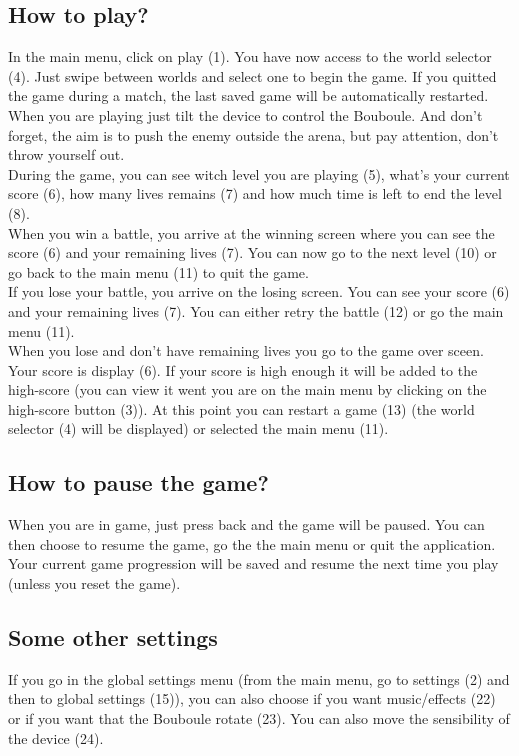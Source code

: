 \documentclass[a4paper,10pt]{report}
\begin{document}
	\subsection*{How to play?}

In the main menu, click on play (1). You have now access to the world selector (4). Just swipe between worlds and select one to begin the game. If you quitted the game during a match, the last saved game will be automatically restarted. \\


When you are playing just tilt the device to control the Bouboule. And don't forget, the aim is to push the enemy outside the arena, but pay attention, don't throw yourself out. \\

During the game, you can see witch level you are playing (5), what's your current score (6), how many lives remains (7) and how much time is left to end the level (8).\\

When you win a battle, you arrive at the winning screen where you can see the score (6) and your remaining lives (7). You can now go to the next level (10) or go back to the main menu (11) to quit the game. \\

If you lose your battle, you arrive on the losing screen. You can see your score (6) and your remaining lives (7). You can either retry the battle (12) or go the main menu (11). \\

When you lose and don't have remaining lives you go to the game over sceen. Your score is display (6). If your score is high enough it will be added to the high-score (you can view it went you are on the main menu by clicking on the high-score button (3)). At this point you can restart a game (13) (the world selector (4) will be displayed) or selected the main menu (11).

	\subsection*{How to pause the game?}

	When you are in game, just press back and the game will be paused. You can then choose to resume the game, go the the main menu or quit the application. Your current game progression will be saved and resume the next time you play (unless you reset the game).
	
	\subsection*{Some other settings}

	If you go in the global settings menu (from the main menu, go to settings (2) and then to global settings (15)), you can also choose if you want music/effects (22) or if you want that the Bouboule rotate (23). You can also move the sensibility of the device (24).
\end{document}
